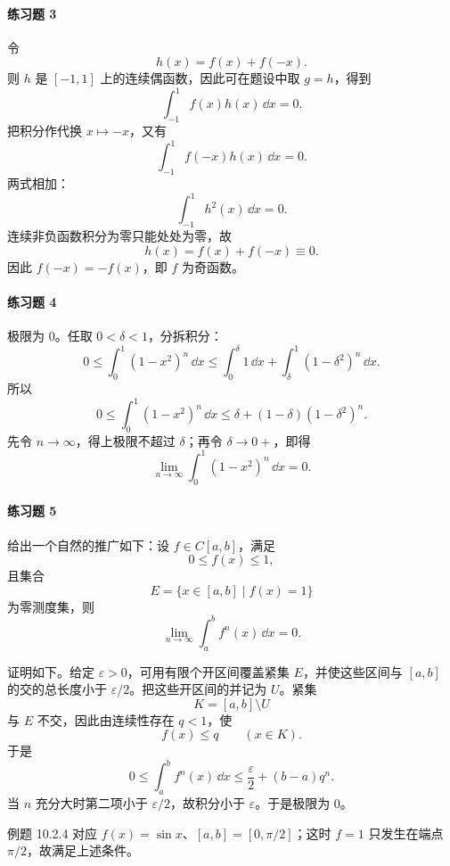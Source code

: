 \paragraph{练习题 3}
\begin{xsolution}
令
\[
  h(x)=f(x)+f(-x).
\]
则 $h$ 是 $[-1,1]$ 上的连续偶函数，因此可在题设中取 $g=h$，得到
\[
  \int_{-1}^1 f(x)h(x)\,\dd x=0.
\]
把积分作代换 $x\mapsto-x$，又有
\[
  \int_{-1}^1 f(-x)h(x)\,\dd x=0.
\]
两式相加：
\[
  \int_{-1}^1 h^2(x)\,\dd x=0.
\]
连续非负函数积分为零只能处处为零，故
\[
  h(x)=f(x)+f(-x)\equiv0.
\]
因此 $f(-x)=-f(x)$，即 $f$ 为奇函数。
\end{xsolution}

\paragraph{练习题 4}
\begin{xsolution}
极限为 $0$。任取 $0<\delta<1$，分拆积分：
\[
  0\leqslant\int_0^1(1-x^2)^n\,\dd x
  \leqslant
  \int_0^\delta1\,\dd x+
  \int_\delta^1(1-\delta^2)^n\,\dd x.
\]
所以
\[
  0\leqslant\int_0^1(1-x^2)^n\,\dd x
  \leqslant\delta+(1-\delta)(1-\delta^2)^n.
\]
先令 $n\to\infty$，得上极限不超过 $\delta$；再令 $\delta\to0+$，即得
\[
  \boxed{\lim_{n\to\infty}\int_0^1(1-x^2)^n\,\dd x=0}.
\]
\end{xsolution}

\paragraph{练习题 5}
\begin{xsolution}
给出一个自然的推广如下：设 $f\in C[a,b]$，满足
\[
  0\leqslant f(x)\leqslant1,
\]
且集合
\[
  E=\{x\in[a,b]\mid f(x)=1\}
\]
为零测度集，则
\[
  \lim_{n\to\infty}\int_a^b f^n(x)\,\dd x=0.
\]

证明如下。给定 $\varepsilon>0$，可用有限个开区间覆盖紧集 $E$，并使这些区间与 $[a,b]$ 的交的总长度小于 $\varepsilon/2$。把这些开区间的并记为 $U$。紧集
\[
  K=[a,b]\setminus U
\]
与 $E$ 不交，因此由连续性存在 $q<1$，使
\[
  f(x)\leqslant q\qquad(x\in K).
\]
于是
\[
  0\leqslant\int_a^b f^n(x)\,\dd x
  \leqslant\frac\varepsilon2+(b-a)q^n.
\]
当 $n$ 充分大时第二项小于 $\varepsilon/2$，故积分小于 $\varepsilon$。于是极限为 $0$。

例题 10.2.4 对应 $f(x)=\sin x$、$[a,b]=[0,\pi/2]$；这时 $f=1$ 只发生在端点 $\pi/2$，故满足上述条件。
\end{xsolution}

